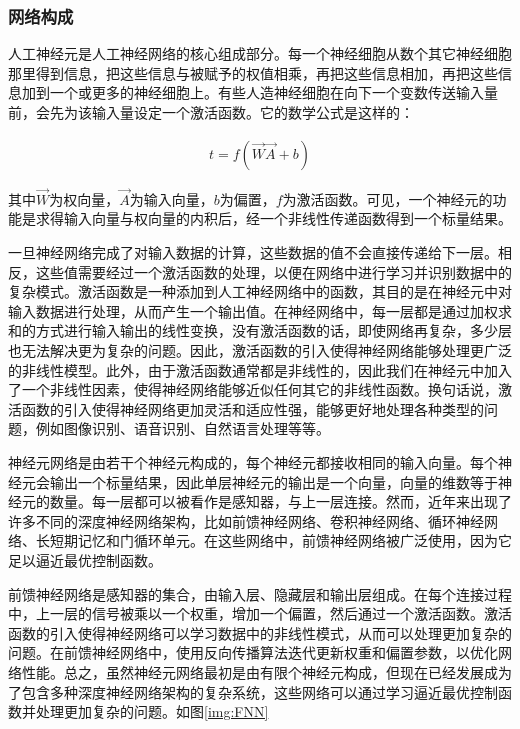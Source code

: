 \subsubsection{网络构成}
人工神经元是人工神经网络的核心组成部分。每一个神经细胞从数个其它神经细胞那里得到信息，把这些信息与被赋予的权值相乘，再把这些信息相加，再把这些信息加到一个或更多的神经细胞上。有些人造神经细胞在向下一个变数传送输入量前，会先为该输入量设定一个激活函数。它的数学公式是这样的：

\begin{gather}
    t=f(\overrightarrow{W} \overrightarrow{A}+b)
\end{gather}

其中$\overrightarrow{W}$为权向量，$\overrightarrow{A}$为输入向量，$b$为偏置，$f$为激活函数。可见，一个神经元的功能是求得输入向量与权向量的内积后，经一个非线性传递函数得到一个标量结果。

一旦神经网络完成了对输入数据的计算，这些数据的值不会直接传递给下一层。相反，这些值需要经过一个激活函数的处理，以便在网络中进行学习并识别数据中的复杂模式。激活函数是一种添加到人工神经网络中的函数，其目的是在神经元中对输入数据进行处理，从而产生一个输出值。在神经网络中，每一层都是通过加权求和的方式进行输入输出的线性变换，没有激活函数的话，即使网络再复杂，多少层也无法解决更为复杂的问题。因此，激活函数的引入使得神经网络能够处理更广泛的非线性模型。此外，由于激活函数通常都是非线性的，因此我们在神经元中加入了一个非线性因素，使得神经网络能够近似任何其它的非线性函数。换句话说，激活函数的引入使得神经网络更加灵活和适应性强，能够更好地处理各种类型的问题，例如图像识别、语音识别、自然语言处理等等。

神经元网络是由若干个神经元构成的，每个神经元都接收相同的输入向量。每个神经元会输出一个标量结果，因此单层神经元的输出是一个向量，向量的维数等于神经元的数量。每一层都可以被看作是感知器，与上一层连接。然而，近年来出现了许多不同的深度神经网络架构，比如前馈神经网络、卷积神经网络、循环神经网络、长短期记忆和门循环单元。在这些网络中，前馈神经网络被广泛使用，因为它足以逼近最优控制函数。

前馈神经网络是感知器的集合，由输入层、隐藏层和输出层组成。在每个连接过程中，上一层的信号被乘以一个权重，增加一个偏置，然后通过一个激活函数。激活函数的引入使得神经网络可以学习数据中的非线性模式，从而可以处理更加复杂的问题。在前馈神经网络中，使用反向传播算法迭代更新权重和偏置参数，以优化网络性能。总之，虽然神经元网络最初是由有限个神经元构成，但现在已经发展成为了包含多种深度神经网络架构的复杂系统，这些网络可以通过学习逼近最优控制函数并处理更加复杂的问题。如图\ref{img:FNN}

